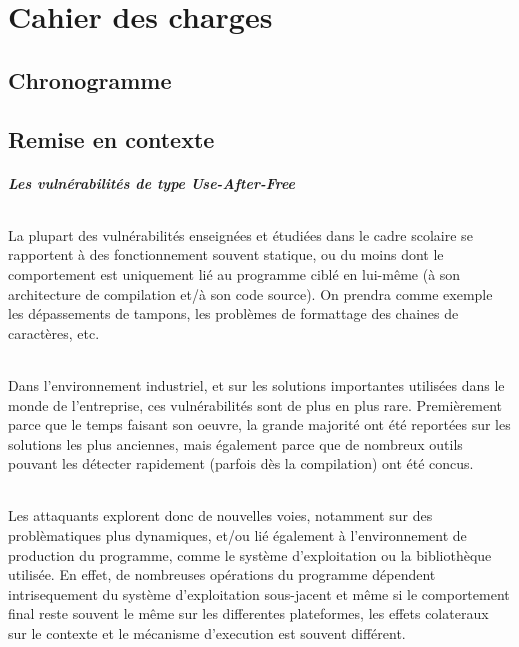 \chapter{Cahier des charges}
\section*{Chronogramme}
\begin{center}
\end{center}
\section{Remise en contexte}
\paragraph{Les vulnérabilités de type Use-After-Free}
\subparagraph{}
La plupart des vulnérabilités enseignées et étudiées dans le cadre scolaire
se rapportent à des fonctionnement souvent statique, ou du moins dont le comportement
est uniquement lié au programme ciblé en lui-même (à son architecture de compilation et/à
son code source). On prendra comme exemple les dépassements de tampons, les problèmes de
formattage des chaines de caractères, etc.\subparagraph{}
Dans l'environnement industriel, et sur les solutions importantes utilisées dans le monde
de l'entreprise, ces vulnérabilités sont de plus en plus rare. Premièrement parce que le temps
faisant son oeuvre, la grande majorité ont été reportées sur les solutions les plus anciennes,
mais également parce que de nombreux outils pouvant les détecter rapidement (parfois dès la compilation)
ont été concus.\subparagraph{}
Les attaquants explorent donc de nouvelles voies, notamment sur des problèmatiques plus dynamiques, et/ou
lié également à l'environnement de production du programme, comme le système d'exploitation ou la bibliothèque utilisée.
En effet, de nombreuses opérations du programme dépendent intrisequement du système d'exploitation sous-jacent et
même si le comportement final reste souvent le même sur les differentes plateformes, les effets colateraux
sur le contexte et le mécanisme d'execution est souvent différent.\subparagraph{}

